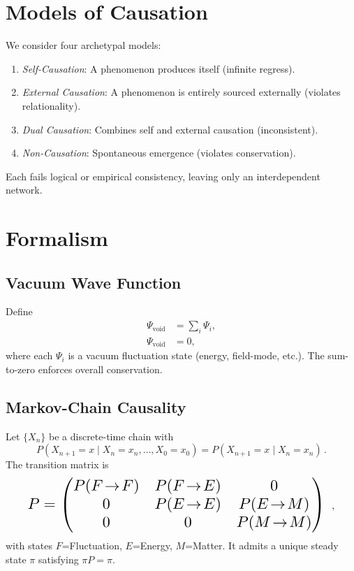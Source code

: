 \documentclass[%
  prd,
  twocolumn,
  10pt,
  nofootinbib,
  tightenlines,
  showkeys
]{revtex4-2}
\begin{document}
\section{Models of Causation}\label{sec:causation}
We consider four archetypal models:
\begin{enumerate}
  \item \emph{Self-Causation}: A phenomenon produces itself (infinite regress).
  \item \emph{External Causation}: A phenomenon is entirely sourced externally
        (violates relationality).
  \item \emph{Dual Causation}: Combines self and external causation (inconsistent).
  \item \emph{Non-Causation}: Spontaneous emergence (violates conservation).
\end{enumerate}
Each fails logical or empirical consistency, leaving only an interdependent network.

\section{Formalism}\label{sec:formalism}

\subsection{Vacuum Wave Function}
Define
\begin{subequations}
\begin{align}
  \Psi_\text{void} &= \sum_i \Psi_i,\\
  \Psi_\text{void} &= 0,
\end{align}
\end{subequations}
where each $\Psi_i$ is a vacuum fluctuation state (energy, field-mode, etc.).
The sum-to-zero enforces overall conservation.

\subsection{Markov-Chain Causality}
Let $\{X_n\}$ be a discrete-time chain with
\begin{equation}
  P(X_{n+1}=x\mid X_n=x_n,\dots,X_0=x_0)
  =P(X_{n+1}=x\mid X_n=x_n)\,.
\end{equation}
The transition matrix is
\[
  \resizebox{0.9\columnwidth}{!}{%
  $P=
  \begin{pmatrix}
    P(F\!\to\!F)&P(F\!\to\!E)&0\\
    0&P(E\!\to\!E)&P(E\!\to\!M)\\
    0&0&P(M\!\to\!M)
  \end{pmatrix}$
  }\,,
\]
with states $F$=Fluctuation, $E$=Energy, $M$=Matter. It admits a unique steady
state $\pi$ satisfying $\pi P=\pi$.
\end{document}
